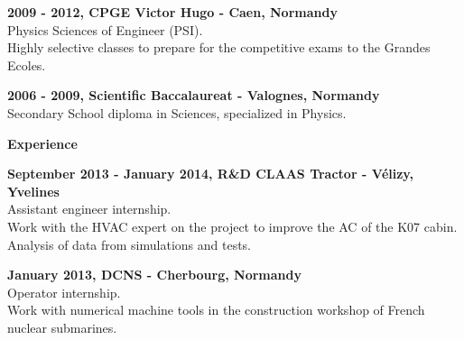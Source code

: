 \documentclass[a4paper,12pt,final]{memoir}
\newcommand{\Sep}{\vspace{1.5em}}
\newcommand{\SmallSep}{\vspace{0.5em}}
\newcommand{\CVSection}[1]
	{\Large\textbf{#1}\par
	\SmallSep\normalsize\normalfont}
\newcommand{\CVItem}[2]
	{\textbf{\color{RoyalBlue} #1 - {\small\color{black}#2}}\normalsize\normalfont}
\begin{document}
\CVItem{2009 - 2012, CPGE Victor Hugo}{Caen, Normandy}\\
Physics Sciences of Engineer (PSI).\\
Highly selective classes to prepare for the competitive exams to the Grandes Ecoles.
\SmallSep

\CVItem{2006 - 2009, Scientific Baccalaureat}{Valognes, Normandy}\\
Secondary School diploma in Sciences, specialized in Physics.
\Sep

\CVSection{Experience}
\CVItem{September 2013 - January 2014, R\&D CLAAS Tractor}{Vélizy, Yvelines}\\
Assistant engineer internship.\\
Work with the HVAC expert on the project to improve the AC of the K07 cabin.
Analysis of data from simulations and tests.
\SmallSep

\CVItem{January 2013, DCNS}{Cherbourg, Normandy}\\
Operator internship.\\
Work with numerical machine tools in the construction workshop of French nuclear
submarines.
\Sep

\end{document}
